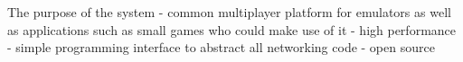 \documentclass{article}
\begin{document}
The purpose of the system
 - common multiplayer platform for emulators as well as applications such as small games who could make use of it
 - high performance
 - simple programming interface to abstract all networking code
 - open source



\clearpage



\end{document}
